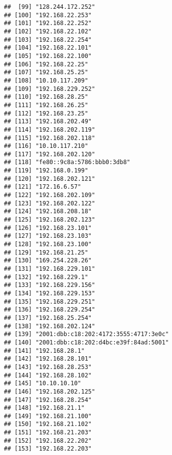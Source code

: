 \documentclass[
]{article}
\begin{document}
\begin{verbatim}
##  [99] "128.244.172.252"                     
## [100] "192.168.22.253"                      
## [101] "192.168.22.252"                      
## [102] "192.168.22.102"                      
## [103] "192.168.22.254"                      
## [104] "192.168.22.101"                      
## [105] "192.168.22.100"                      
## [106] "192.168.22.25"                       
## [107] "192.168.25.25"                       
## [108] "10.10.117.209"                       
## [109] "192.168.229.252"                     
## [110] "192.168.28.25"                       
## [111] "192.168.26.25"                       
## [112] "192.168.23.25"                       
## [113] "192.168.202.49"                      
## [114] "192.168.202.119"                     
## [115] "192.168.202.118"                     
## [116] "10.10.117.210"                       
## [117] "192.168.202.120"                     
## [118] "fe80::9c8a:5786:bbb0:3db8"           
## [119] "192.168.0.199"                       
## [120] "192.168.202.121"                     
## [121] "172.16.6.57"                         
## [122] "192.168.202.109"                     
## [123] "192.168.202.122"                     
## [124] "192.168.208.18"                      
## [125] "192.168.202.123"                     
## [126] "192.168.23.101"                      
## [127] "192.168.23.103"                      
## [128] "192.168.23.100"                      
## [129] "192.168.21.25"                       
## [130] "169.254.228.26"                      
## [131] "192.168.229.101"                     
## [132] "192.168.229.1"                       
## [133] "192.168.229.156"                     
## [134] "192.168.229.153"                     
## [135] "192.168.229.251"                     
## [136] "192.168.229.254"                     
## [137] "192.168.25.254"                      
## [138] "192.168.202.124"                     
## [139] "2001:dbb:c18:202:4172:3555:4717:3e0c"
## [140] "2001:dbb:c18:202:d4bc:e39f:84ad:5001"
## [141] "192.168.28.1"                        
## [142] "192.168.28.101"                      
## [143] "192.168.28.253"                      
## [144] "192.168.28.102"                      
## [145] "10.10.10.10"                         
## [146] "192.168.202.125"                     
## [147] "192.168.28.254"                      
## [148] "192.168.21.1"                        
## [149] "192.168.21.100"                      
## [150] "192.168.21.102"                      
## [151] "192.168.21.203"                      
## [152] "192.168.22.202"                      
## [153] "192.168.22.203"                      

\end{verbatim}
\end{document}
